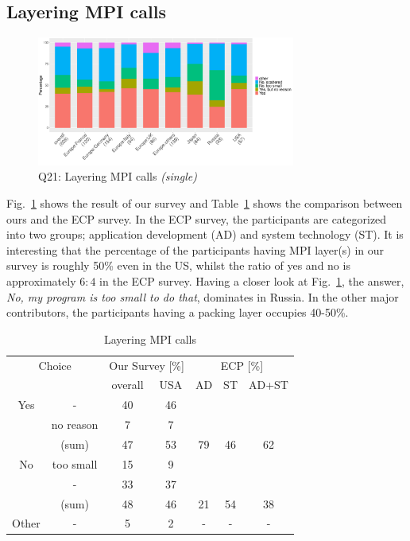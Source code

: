 \documentclass[preprint,5p,times]{elsarticle}
\def\myquote#1{{\it #1}}
\def\mcountries{major contributors\xspace{}}%
\begin{document}
\subsection{Layering MPI calls}\label{sec:mpi-calls}

\begin{figure}[htb]
  \begin{center}
    \includegraphics[width=8.5cm]{R-scripts/Q21.pdf}
    \caption{Q21: Layering MPI calls {\it(single)}}
    \label{fig:layering-mpi-calls}
  \end{center}
\end{figure}

Fig.~\ref{fig:layering-mpi-calls} shows the result of our survey and
Table~\ref{tab:layering-mpi-calls} shows the comparison between ours
and the ECP survey. In the ECP survey, the participants are categorized
into two groups; application development (AD) and system technology
(ST). It is interesting that the percentage of the participants having
MPI layer(s) in our survey is roughly 50\% even in the US, whilst the
ratio of yes and no is approximately $6:4$ in the ECP survey.
Having a closer look at Fig.~\ref{fig:layering-mpi-calls}, the answer,
\myquote{No, my program is too small to do that}, dominates in Russia. In
the other \mcountries, the participants having a packing layer occupies
40-50\%.

\begin{table}[htb]%
  \small%
  \begin{center}%
    \caption{Layering MPI calls}\label{tab:layering-mpi-calls}%
    \begin{tabular}{c|c||c|c||c|c|c}%
      \hline%
      \multicolumn{2}{c||}{Choice} & \multicolumn{2}{c||}{Our Survey [\%]} &
      \multicolumn{3}{c}{ECP [\%]} \\
      \cline{3-7}%
      \multicolumn{2}{c||}{} & overall & USA & AD & ST & AD+ST \\
      \hline%
      \hline%
      Yes & - & 40 & 46 & & & \\
      & no reason & 7 & 7 & & & \\
      \cline{2-4}%
      & (sum) & 47 & 53 &  79 & 46 & 62 \\
      \hline%
      \hline%
      No & too small & 15 & 9 & & & \\
      & - & 33 & 37 & & & \\
      \cline{2-4}%
      & (sum) & 48 & 46 & 21 & 54 & 38 \\
      \hline%
      \hline%
      Other & - & 5 & 2 & - & - & - \\
      \hline%
    \end{tabular}%
  \end{center}%
\end{table}%
\end{document}
